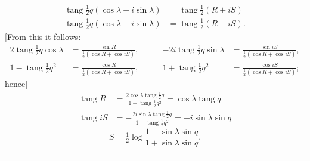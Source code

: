 \[
\begin{aligned}
\operatorname{tang}\tfrac12 q(\cos\lambda-i\sin\lambda)&=\operatorname{tang}\tfrac12(R+iS)\\
\operatorname{tang}\tfrac12 q(\cos\lambda+i\sin\lambda)&=\operatorname{tang}\tfrac12(R-iS).
\end{aligned}
\]
[From this it follows:
\[
\begin{alignedat}{2}
2\operatorname{tang}\tfrac12 q\cos\lambda&=\frac{\sin R}{\tfrac12(\cos R+\cos iS)},\qquad&
-2i\operatorname{tang}\tfrac12 q\sin\lambda&=\frac{\sin iS}{\tfrac12(\cos R+\cos iS)},\\
1-\operatorname{tang}\tfrac12 q^2&=\frac{\cos R}{\tfrac12(\cos R+\cos iS)},&
1+\operatorname{tang}\tfrac12 q^2&=\frac{\cos iS}{\tfrac12(\cos R+\cos iS)};
\end{alignedat}
\]
\noindent hence]
\[
\begin{aligned}
\operatorname{tang} R&=\frac{2\cos\lambda\operatorname{tang}\tfrac12 q}{1-\operatorname{tang}\tfrac12 q^2}
=\cos\lambda\operatorname{tang} q\\
\operatorname{tang} iS&=-\frac{2i\sin\lambda\operatorname{tang}\tfrac12 q}{1+\operatorname{tang}\tfrac12 q^2}
=-i\sin\lambda\sin q
\end{aligned}
\]
\noindent [or]
\[
S=\tfrac12\log\frac{1-\sin\lambda\sin q}{1+\sin\lambda\sin q}.
\]
\begin{center}\rule{.18\linewidth}{.4pt}\end{center}
\small
\setlength{\abovedisplayskip}{5pt}
\setlength{\belowdisplayskip}{5pt}
\setlength{\abovedisplayshortskip}{3pt}
\setlength{\belowdisplayshortskip}{3pt}

\par\clearpage

